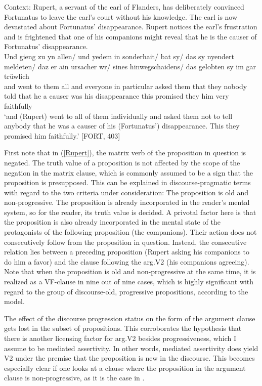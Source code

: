 \documentclass[output=paper,colorlinks,citecolor=brown]{langscibook}
\begin{document}
\ea \label{Rupert}
Context: Rupert, a servant of the earl of Flanders, has deliberately convinced Fortunatus to leave the earl's court without his knowledge. The earl is now devastated about Fortunatus' disappearance. Rupert notices the earl's frustration and is frightened that one of his companions might reveal that he is the causer of Fortunatus' disappearance.\\
\gll Und gieng zu yn allen/ und yedem in sonderhait/ bat sy/ das sy nyendert meldeten/ daz er ain ursacher w\oldae{}r/ sines hinwegschaidens/ das gelobten sy im gar trüwlich \\
and went to them all and everyone in particular asked them that they nobody told that he a causer was his disappearance this promised they him very faithfully\\
\glt `and (Rupert) went to all of them individually and asked them not to tell anybody that he was a causer of his (Fortunatus') disappearance. This they promised him faithfully.' \hfill [FORT, 403]
\z

First note that in (\ref{Rupert}), the matrix verb of the proposition in question is negated. The truth value of a proposition is not affected by the scope of the negation in the matrix clause, which is commonly assumed to be a sign that the proposition is presupposed. This can be explained in discourse-pragmatic terms with regard to the two criteria under consideration: The proposition is old and non-progressive. The proposition is already incorporated in the reader's mental system, so for the reader, its truth value is decided. A privotal factor here is that the proposition is also already incorporated in the mental state of the protagonists of the following proposition (the companions). Their action does not consecutively follow from the proposition in question. Instead, the consecutive relation lies between a preceding proposition (Rupert asking his companions to do him a favor) and the clause following the arg.V2 (his companions agreeing). Note that when the proposition is old and non-progressive at the same time, it is realized as a VF-clause in nine out of nine cases, which is highly significant with regard to the group of discourse-old, progressive propositions, according to the model.

The effect of the discourse progression status on the form of the argument clause gets lost in the subset of  propositions. This corroborates the hypothesis that there is another licensing factor for arg.V2 besides progressiveness, which I assume to be mediated assertivity. In other words, mediated assertivity does yield V2 under the premise that the proposition is new in the discourse. This becomes especially clear if one looks at a clause where the proposition in the argument clause is non-progressive, as it is the case in .
\end{document}
